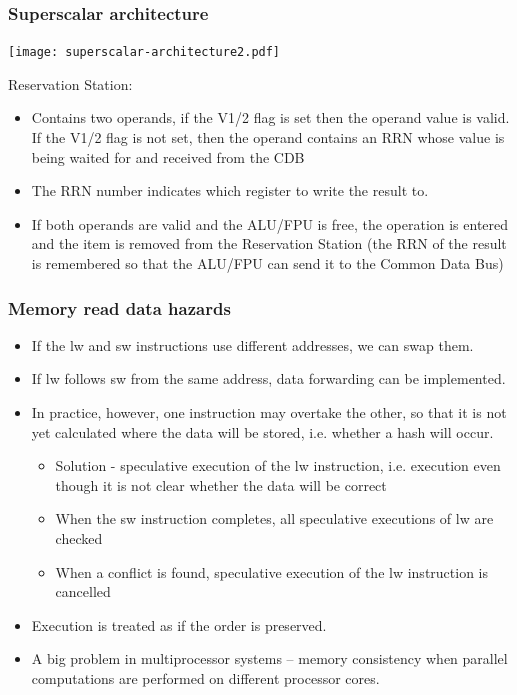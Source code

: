 \documentclass{beamer}
\begin{document}
\begin{frame}
\frametitle{Superscalar architecture}

\begin{center}
\texttt{[image: superscalar-architecture2.pdf]}
\end{center}

\scriptsize
Reservation Station:
\begin{itemize}
\item Contains two operands, if the V1/2 flag is set then the operand value is valid. If the V1/2 flag is not set, then the operand contains an RRN whose value is being waited for and received from the CDB
\item The RRN number indicates which register to write the result to.
\item If both operands are valid and the ALU/FPU is free, the operation is entered and the item is removed from the Reservation Station (the RRN of the result is remembered so that the ALU/FPU can send it to the Common Data Bus)
\end{itemize}

\end{frame}

\begin{frame}
\frametitle{Memory read data hazards}

\begin{itemize}
\item If the lw and sw instructions use different addresses, we can swap them.
\item If lw follows sw from the same address, data forwarding can be implemented.
\item In practice, however, one instruction may overtake the other, so that it is not yet calculated where the data will be stored, i.e. whether a hash will occur.
\begin{itemize}
\item Solution - speculative execution of the lw instruction, i.e. execution even though it is not clear whether the data will be correct
\item When the sw instruction completes, all speculative executions of lw are checked
\item When a conflict is found, speculative execution of the lw instruction is cancelled
\end{itemize}
\item Execution is treated as if the order is preserved.
\item A big problem in multiprocessor systems -- memory consistency when parallel computations are performed on different processor cores.
\end{itemize}

\end{frame}
\end{document}
